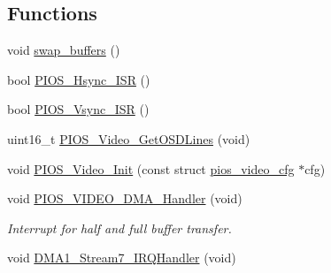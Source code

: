 \subsection*{\-Functions}
\begin{DoxyCompactItemize}
\item 
void \hyperlink{group___p_i_o_s___v_i_d_e_o_ga0d157d997329169f936545f9985e334b}{swap\-\_\-buffers} ()
\item 
bool \hyperlink{group___p_i_o_s___v_i_d_e_o_ga80058030e4245438ea8a76bd5c98b133}{\-P\-I\-O\-S\-\_\-\-Hsync\-\_\-\-I\-S\-R} ()
\item 
bool \hyperlink{group___p_i_o_s___v_i_d_e_o_ga85b37fc7c59ec730520859920f0e1efb}{\-P\-I\-O\-S\-\_\-\-Vsync\-\_\-\-I\-S\-R} ()
\item 
uint16\-\_\-t \hyperlink{group___p_i_o_s___v_i_d_e_o_ga79339656dd43737af275c88061f31458}{\-P\-I\-O\-S\-\_\-\-Video\-\_\-\-Get\-O\-S\-D\-Lines} (void)
\item 
void \hyperlink{group___p_i_o_s___v_i_d_e_o_ga1dd937879200d15d16de47a439556adb}{\-P\-I\-O\-S\-\_\-\-Video\-\_\-\-Init} (const struct \hyperlink{structpios__video__cfg}{pios\-\_\-video\-\_\-cfg} $\ast$cfg)
\item 
void \hyperlink{group___p_i_o_s___v_i_d_e_o_ga7ceca4d5d94790fa8dc69537bccf004d}{\-P\-I\-O\-S\-\_\-\-V\-I\-D\-E\-O\-\_\-\-D\-M\-A\-\_\-\-Handler} (void)
\begin{DoxyCompactList}\small\item\em \-Interrupt for half and full buffer transfer. \end{DoxyCompactList}\item 
void \hyperlink{group___p_i_o_s___v_i_d_e_o_gae81787590524971351490705554cc351}{\-D\-M\-A1\-\_\-\-Stream7\-\_\-\-I\-R\-Q\-Handler} (void)
\end{DoxyCompactItemize}
